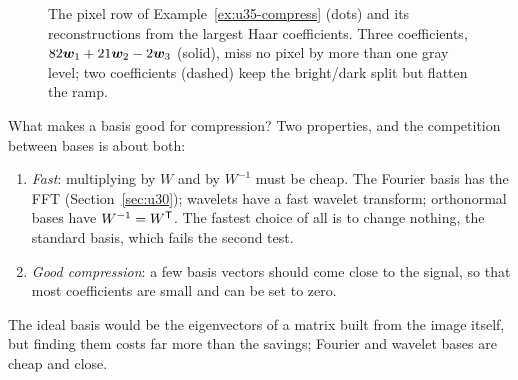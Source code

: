 \begin{figure}[ht]\centering
{}
\caption{The pixel row of Example~\ref{ex:u35-compress} (dots) and its reconstructions from the
largest Haar coefficients. Three coefficients, $82\boldsymbol{w}_1+21\boldsymbol{w}_2-2\boldsymbol{w}_3$ (solid), miss no pixel by
more than one gray level; two coefficients (dashed) keep the bright/dark split but flatten the
ramp.}
\label{fig:u35-signal}
\end{figure}

What makes a basis good for compression? Two properties, and the competition between bases
is about both:
\begin{enumerate}
  \item \emph{Fast}: multiplying by $W$ and by $W^{-1}$ must be cheap. The Fourier basis has the FFT
        (Section~\ref{sec:u30}); wavelets have a fast wavelet transform; orthonormal bases have
        $W^{-1}=W^{\mathsf{T}}$. The fastest choice of all is to change nothing, the standard basis, which fails
        the second test.
  \item \emph{Good compression}: a few basis vectors should come close to the signal, so that most
        coefficients are small and can be set to zero.
\end{enumerate}
The ideal basis would be the eigenvectors of a matrix built from the image itself, but finding
them costs far more than the savings; Fourier and wavelet bases are cheap and close.

